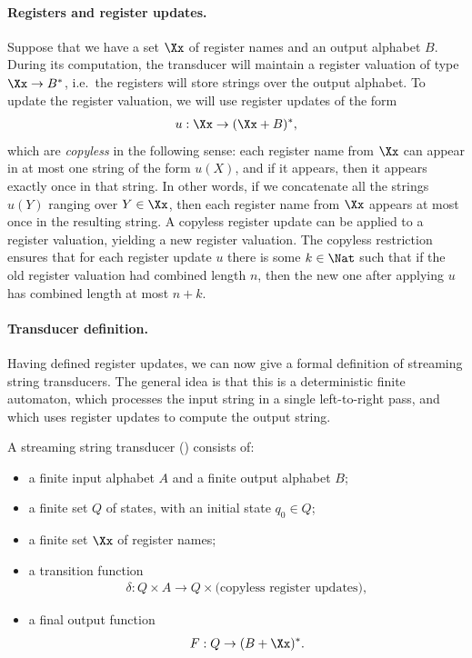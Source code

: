 \paragraph*{Registers and register updates.}
Suppose that we have a set $\Xx$ of register names and an output alphabet $B$.  During its computation, the transducer will maintain a register valuation of type $\Xx \to B^*$, i.e.~the registers will store strings over the output alphabet. To update the register valuation, we will use register updates of the form 
\begin{align*}
 u : \Xx \to (\Xx + B)^*,
\end{align*}
which are \emph{copyless} in the following sense: each register name from $\Xx$ can appear in at most one string of the form $u(X)$, and if it appears, then it appears exactly once in that string. In other words, if we concatenate all the strings $u(Y)$ ranging over $Y \in \Xx$, then each register name from $\Xx$ appears at most once in the resulting string. A copyless register update can be applied to a register valuation, yielding a new register valuation. The copyless restriction ensures that for each register update $u$ there is some $k \in \Nat$ such that if the old register valuation had combined length $n$, then the new one after applying $u$ has combined length at most $n+k$. 

\paragraph*{Transducer definition.} Having defined register updates, we can now give a formal definition of streaming string transducers. The general idea is that this is a deterministic finite automaton, which processes the input string in a single left-to-right pass, and which uses register updates to compute the output string.
\begin{definition}
    [\sst]
    \label{def:sst}
    A streaming string transducer (\sst) consists of: 
    \begin{itemize}
        \item a finite input alphabet $A$ and a finite output alphabet $B$;
        \item a finite set $Q$ of states, with an initial state $q_0 \in Q$;
        \item a finite set $\Xx$ of register names;
        \item a transition function 
        \begin{align*}
        \delta : Q \times A \to Q \times \text{(copyless register updates)},
        \end{align*}
        \item a final output function
        \begin{align*}
        F : Q \to (B + \Xx)^*.
        \end{align*}
    \end{itemize}
\end{definition}



